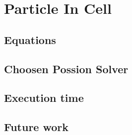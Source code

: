 \section{Particle In Cell}
\subsection{Equations}
\subsection{Choosen Possion Solver}
\subsection{Execution time}
\subsection{Future work}
% 